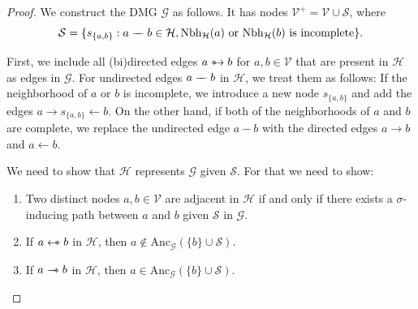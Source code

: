 \documentclass[accepted]{uai2025} %
\newcommand{\anc}{\text{Anc}}
\newcommand{\hus}{\mathrel{{\leftarrow\mkern-11mu\ast}}}
\newcommand{\suh}{\mathrel{{\ast\mkern-11mu\to}}}
\newcommand{\tus}{\mathrel{{\relbar\mkern-11mu\relbar\mkern-11mu\ast}}}
\newcommand{\tut}{\mathrel{{\relbar\mkern-9mu\relbar}}}
\begin{document}
\lemmaone*
\begin{proof}
We construct the DMG \( \mathcal{G} \) as follows. It has nodes \( \mathcal{V}^+ = \mathcal{V} \cup \mathcal{S} \), where  
\[
\mathcal{S} = \{s_{\{a,b\}} : a\tut b \in \mathcal{H}, \text{Nbh}_\mathcal{H}(a)  \text{ or } \text{Nbh}_\mathcal{H}(b) \text{ is incomplete}\}.
\]  

First, we include all (bi)directed edges \( a \suh b \) for \(a,b \in \mathcal{V} \) that are present in \( \mathcal{H} \) as edges in \( \mathcal{G} \). For undirected edges \( a\tut b \) in \( \mathcal{H} \), we treat them as follows: If the neighborhood of \( a \) or $b$ is incomplete, we introduce a new node \( s_{\{a, b\}} \) and add the edges \( a \rightarrow s_{\{a, b\}} \leftarrow b \). On the other hand, if both of the neighborhoods of \( a \) and $b$ are complete, we replace the undirected edge \( a - b \) with the directed edges \( a \rightarrow b \) and \( a \leftarrow b \). 

We need to show that \( \mathcal{H} \) represents \( \mathcal{G} \) given \( \mathcal{S} \). For that we need to show:
\begin{enumerate}
    \item Two distinct nodes \(a, b \in \mathcal{V}\) are adjacent in \(\mathcal{H}\) if and only if there exists a \(\sigma\)-inducing path between \(a\) and \(b\) given \(\mathcal{S}\) in \(\mathcal{G}\).
    \item If \(a \hus b\) in \(\mathcal{H}\), then \(a \notin \anc_\mathcal{G}(\{b\} \cup \mathcal{S})\).
    \item If \(a \tus b\) in \(\mathcal{H}\), then \(a \in \anc_\mathcal{G}(\{b\} \cup \mathcal{S})\).
\end{enumerate}


\end{proof}
\end{document}
